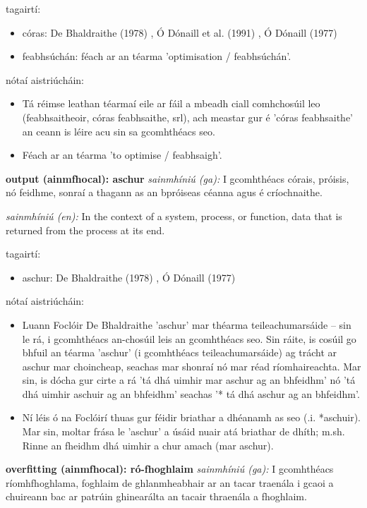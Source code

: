 \documentclass{article}
\begin{document}
tagairtí:
\begin{itemize}
	\item córas: De Bhaldraithe (1978) \cite{de-bhaldraithe}, Ó Dónaill et al. (1991) \cite{focloir-beag}, Ó Dónaill (1977) \cite{odonaill}
	\item feabhsúchán: féach ar an téarma 'optimisation / feabhsúchán'.
\end{itemize}

nótaí aistriúcháin:
\begin{itemize}
	\item Tá réimse leathan téarmaí eile ar fáil a mbeadh ciall comhchosúil leo (feabhsaitheoir, córas feabhsaithe, srl), ach meastar gur é 'córas feabhsaithe' an ceann is léire acu sin sa gcomhthéacs seo.
	\item Féach ar an téarma 'to optimise / feabhsaigh'.
\end{itemize}


\textbf{output (ainmfhocal): aschur}
\textit{sainmhíniú (ga):} I gcomhthéacs córais, próisis, nó feidhme, sonraí a thagann as an bpróiseas céanna agus é críochnaithe.

\textit{sainmhíniú (en):} In the context of a system, process, or function, data that is returned from the process at its end.

tagairtí:
\begin{itemize}
	\item aschur: De Bhaldraithe (1978) \cite{de-bhaldraithe}, Ó Dónaill (1977) \cite{odonaill}
\end{itemize}

nótaí aistriúcháin:
\begin{itemize}
	\item Luann Foclóir De Bhaldraithe 'aschur' mar théarma teileachumarsáide -- sin le rá, i gcomhthéacs an-chosúil leis an gcomhthéacs seo. Sin ráite, is cosúil go bhfuil an téarma 'aschur' (i gcomhthéacs teileachumarsáide) ag trácht ar aschur mar choincheap, seachas mar shonraí nó mar réad ríomhaireachta. Mar sin, is dócha gur cirte a rá 'tá dhá uimhir mar aschur ag an bhfeidhm' nó 'tá dhá uimhir aschuir ag an bhfeidhm' seachas '* tá dhá aschur ag an bhfeidhm'.
	\item Ní léis ó na Foclóirí thuas gur féidir briathar a dhéanamh as seo (.i. *aschuir). Mar sin, moltar frása le 'aschur' a úsáid nuair atá briathar de dhíth; m.sh. Rinne an fheidhm dhá uimhir a chur amach (mar aschur).
\end{itemize}


\textbf{overfitting (ainmfhocal): ró-fhoghlaim}
\textit{sainmhíniú (ga):} I gcomhthéacs ríomhfhoghlama, foghlaim de ghlanmheabhair ar an tacar traenála i gcaoi a chuireann bac ar patrúin ghinearálta an tacair thraenála a fhoghlaim.
\end{document}
